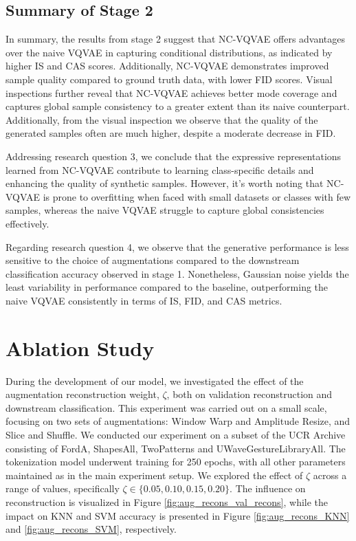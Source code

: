 \documentclass[../../thesis.tex]{subfiles}
\begin{document}
\subsection*{Summary of Stage 2}

In summary, the results from stage 2 suggest that NC-VQVAE offers advantages over the naive VQVAE in capturing conditional distributions, as indicated by higher IS and CAS scores. Additionally, NC-VQVAE demonstrates improved sample quality compared to ground truth data, with lower FID scores. Visual inspections further reveal that NC-VQVAE achieves better mode coverage and captures global sample consistency to a greater extent than its naive counterpart. Additionally, from the visual inspection we observe that the quality of the generated samples often are much higher, despite a moderate decrease in FID.\newline

Addressing research question 3, we conclude that the expressive representations learned from NC-VQVAE contribute to learning class-specific details and enhancing the quality of synthetic samples. However, it's worth noting that NC-VQVAE is prone to overfitting when faced with small datasets or classes with few samples, whereas the naive VQVAE struggle to capture global consistencies effectively.\newline

Regarding research question 4, we observe that the generative performance is less sensitive to the choice of augmentations compared to the downstream classification accuracy observed in stage 1. Nonetheless, Gaussian noise yields the least variability in performance compared to the baseline, outperforming the naive VQVAE consistently in terms of IS, FID, and CAS metrics.

\section{Ablation Study}
\label{Section:Ablation}
During the development of our model, we investigated the effect of the augmentation reconstruction weight, $\zeta$, both on validation reconstruction and downstream classification. This experiment was carried out on a small scale, focusing on two sets of augmentations: Window Warp and Amplitude Resize, and Slice and Shuffle. We conducted our experiment on a subset of the UCR Archive consisting of FordA, ShapesAll, TwoPatterns and UWaveGestureLibraryAll. The tokenization model underwent training for 250 epochs, with all other parameters maintained as in the main experiment setup. We explored the effect of $\zeta$ across a range of values, specifically $\zeta \in \{0.05, 0.10, 0.15, 0.20\}$. The influence on reconstruction is visualized in Figure \ref{fig:aug_recons_val_recons}, while the impact on KNN and SVM accuracy is presented in Figure \ref{fig:aug_recons_KNN} and \ref{fig:aug_recons_SVM}, respectively.\newline
\end{document}

